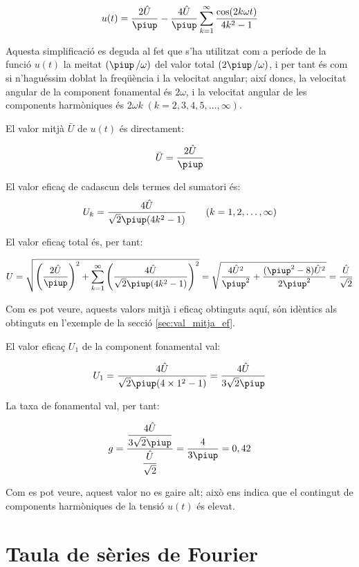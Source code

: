 \begin{exemple}
    \[
    u(t) = \frac{2\hat{U}}{\piup} - \frac{4\hat{U}}{\piup} \sum_{k=1}^\infty
          \frac{\cos(2 k \omega t)}{4k^2-1}
    \]

    Aquesta simplificació es deguda al fet que s'ha utilitzat com a
    període de la funció $u(t)$ la meitat $(\piup\,/\omega)$ del valor total
    $(2\piup\,/\omega)$, i per tant és com si n'haguéssim doblat la
    freqüència i la velocitat angular; així doncs, la velocitat angular
    de la component fonamental és $2\omega$, i la velocitat angular de
    les components harmòniques és $2\omega k \;(k=2,3,4,5,\ldots,\infty)$.

    El valor mitjà $\bar{U}$ de $u(t)$ és directament:

    \[
        \bar{U} = \frac{2\hat{U}}{\piup}
    \]

    El valor eficaç de cadascun dels termes del sumatori és:
    \[
        U_k =\frac{4\hat{U}}{\sqrt{2}\piup(4k^2-1)}
        \qquad(k=1,2,\ldots,\infty)
    \]

    El valor eficaç total és, per tant:

    \[
        U=\sqrt{\left(\frac{2\hat{U}}{\piup}\right)^2 + \sum_{k=1}^\infty
        \left(\frac{4\hat{U}}{\sqrt{2}\piup(4k^2-1)}\right)^2} =
        \sqrt{\frac{4\hat{U}^2}{\piup^2} + \frac{(\piup^2-8)\hat{U}^2}{2\piup^2}
        }= \frac{\hat{U}}{\sqrt{2}}
    \]

    Com es pot veure, aquests valors mitjà i eficaç obtinguts aquí, són
    idèntics als obtinguts en l'exemple de la secció
    \ref{sec:val_mitja_ef}.

    El valor eficaç $U_1$ de la component fonamental val:

    \[
        U_1 =\frac{4\hat{U}}{\sqrt{2}\piup(4\times 1^2-1)} =
        \frac{4\hat{U}}{3\sqrt{2}\piup}
    \]

    La taxa de fonamental val, per tant:

    \[
        g =
        \frac{\dfrac{4\hat{U}}{3\sqrt{2}\piup}}{\dfrac{\hat{U}}{\sqrt{2}}}
        =\frac{4}{3\piup} = 0,{42}
    \]

    Com es pot veure, aquest valor no es gaire alt; això ens indica que
    el contingut de components harmòniques de la tensió $u(t)$ és
    elevat.
\end{exemple}


\section{Taula de sèries de Fourier}

